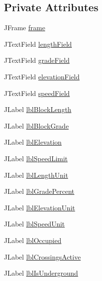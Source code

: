 \subsection*{Private Attributes}
\begin{DoxyCompactItemize}
\item 
J\+Frame \hyperlink{classTrackModel_1_1TrackGUI_afbf142ba83539e2969d3f71105fcd9bc}{frame}
\item 
J\+Text\+Field \hyperlink{classTrackModel_1_1TrackGUI_ac8d1e32c1ba369deb753a052dd055627}{length\+Field}
\item 
J\+Text\+Field \hyperlink{classTrackModel_1_1TrackGUI_a3f2d40069de0797f2df894ba42df8528}{grade\+Field}
\item 
J\+Text\+Field \hyperlink{classTrackModel_1_1TrackGUI_a4020c45cde27dfcf04a96c1a7136ee33}{elevation\+Field}
\item 
J\+Text\+Field \hyperlink{classTrackModel_1_1TrackGUI_ae38c86c47dd990edffe703acaa29ced0}{speed\+Field}
\item 
J\+Label \hyperlink{classTrackModel_1_1TrackGUI_a0e8f63d8525e33bf35edde9c57a416fd}{lbl\+Block\+Length}
\item 
J\+Label \hyperlink{classTrackModel_1_1TrackGUI_abcc3db1fe345d00632d5a29987eb5f46}{lbl\+Block\+Grade}
\item 
J\+Label \hyperlink{classTrackModel_1_1TrackGUI_a8ea36b1ecc1780cc951415e05069c7fa}{lbl\+Elevation}
\item 
J\+Label \hyperlink{classTrackModel_1_1TrackGUI_a390fd251f4338a570ded42a95ef2d9f8}{lbl\+Speed\+Limit}
\item 
J\+Label \hyperlink{classTrackModel_1_1TrackGUI_ada34f76d9acc01d43aa79033e90855cd}{lbl\+Length\+Unit}
\item 
J\+Label \hyperlink{classTrackModel_1_1TrackGUI_ab42f31f950e3cebdc7b71a9ef35bae6c}{lbl\+Grade\+Percent}
\item 
J\+Label \hyperlink{classTrackModel_1_1TrackGUI_a3140938ab0b72e3984c0787e412d9fee}{lbl\+Elevation\+Unit}
\item 
J\+Label \hyperlink{classTrackModel_1_1TrackGUI_a7238d66f96bc0a85ca437ac6de1faa71}{lbl\+Speed\+Unit}
\item 
J\+Label \hyperlink{classTrackModel_1_1TrackGUI_ac866848253cc9bca3d7a8cbfcf2b5493}{lbl\+Occupied}
\item 
J\+Label \hyperlink{classTrackModel_1_1TrackGUI_a863b8f99c02dac7d8fd51eccf5ddc1f0}{lbl\+Crossings\+Active}
\item 
J\+Label \hyperlink{classTrackModel_1_1TrackGUI_ab1bf4e948e8db5dafdb09ed558140d52}{lbl\+Is\+Underground}

\end{DoxyCompactItemize}
